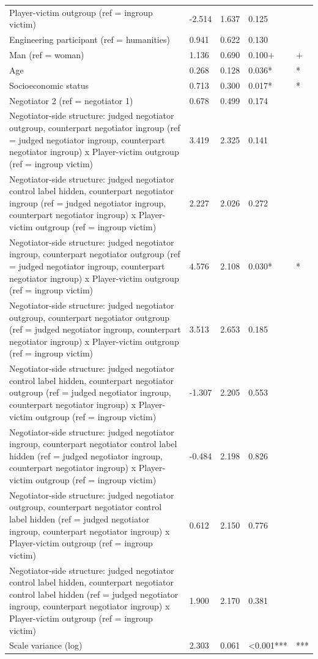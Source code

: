 \documentclass[11pt]{article}
\begin{document}
\begin{table}[H]
{\begin{tabular}{lllll}
Player-victim outgroup (ref = ingroup victim) & -2.514 & 1.637 & 0.125 &  \\
Engineering participant (ref = humanities) & 0.941 & 0.622 & 0.130 &  \\
Man (ref = woman) & 1.136 & 0.690 & 0.100+ & + \\
Age & 0.268 & 0.128 & 0.036* & * \\
Socioeconomic status & 0.713 & 0.300 & 0.017* & * \\
Negotiator 2 (ref = negotiator 1) & 0.678 & 0.499 & 0.174 &  \\
Negotiator-side structure: judged negotiator outgroup, counterpart negotiator ingroup (ref = judged negotiator ingroup, counterpart negotiator ingroup) x Player-victim outgroup (ref = ingroup victim) & 3.419 & 2.325 & 0.141 &  \\
Negotiator-side structure: judged negotiator control label hidden, counterpart negotiator ingroup (ref = judged negotiator ingroup, counterpart negotiator ingroup) x Player-victim outgroup (ref = ingroup victim) & 2.227 & 2.026 & 0.272 &  \\
Negotiator-side structure: judged negotiator ingroup, counterpart negotiator outgroup (ref = judged negotiator ingroup, counterpart negotiator ingroup) x Player-victim outgroup (ref = ingroup victim) & 4.576 & 2.108 & 0.030* & * \\
Negotiator-side structure: judged negotiator outgroup, counterpart negotiator outgroup (ref = judged negotiator ingroup, counterpart negotiator ingroup) x Player-victim outgroup (ref = ingroup victim) & 3.513 & 2.653 & 0.185 &  \\
Negotiator-side structure: judged negotiator control label hidden, counterpart negotiator outgroup (ref = judged negotiator ingroup, counterpart negotiator ingroup) x Player-victim outgroup (ref = ingroup victim) & -1.307 & 2.205 & 0.553 &  \\
Negotiator-side structure: judged negotiator ingroup, counterpart negotiator control label hidden (ref = judged negotiator ingroup, counterpart negotiator ingroup) x Player-victim outgroup (ref = ingroup victim) & -0.484 & 2.198 & 0.826 &  \\
Negotiator-side structure: judged negotiator outgroup, counterpart negotiator control label hidden (ref = judged negotiator ingroup, counterpart negotiator ingroup) x Player-victim outgroup (ref = ingroup victim) & 0.612 & 2.150 & 0.776 &  \\
Negotiator-side structure: judged negotiator control label hidden, counterpart negotiator control label hidden (ref = judged negotiator ingroup, counterpart negotiator ingroup) x Player-victim outgroup (ref = ingroup victim) & 1.900 & 2.170 & 0.381 &  \\
Scale variance (log) & 2.303 & 0.061 & <0.001*** & *** \\
\bottomrule
\end{tabular}
}
\end{table}
\end{document}
